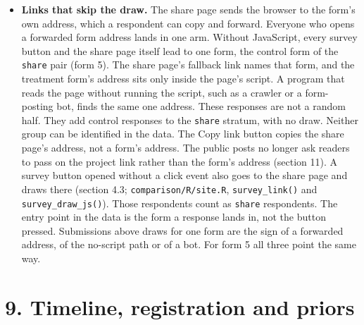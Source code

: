 \begin{itemize}
  \textbf{Respondents who give an email.} Their answers are also reported separately, as the survey
  promises. The registered analysis uses all responses.
\item
  \textbf{Links that skip the draw.} The share page sends the
  browser to the form's own address, which a respondent can copy and forward. Everyone who opens a
  forwarded form address lands in one arm. Without JavaScript, every survey button and the share
  page itself lead to one form, the control form of the \texttt{share} pair (form 5). The share page's
  fallback link names that form, and the treatment form's address sits only inside the page's
  script. A program that reads the page without running the script, such as a crawler or a
  form-posting bot, finds the same one address. These responses are not a random half. They add
  control responses to the \texttt{share} stratum, with no draw. Neither group can be identified in the
  data. The Copy link button copies the share page's address, not a form's address. The public
  posts no longer ask readers to pass on the project link rather than the form's address (section
  11). A survey button opened without a click event also goes to the share page and draws there
  (section 4.3; \texttt{comparison/R/site.R}, \texttt{survey\_link()} and \texttt{survey\_draw\_js()}). Those respondents
  count as \texttt{share} respondents. The entry point in the data is the form a response lands in, not
  the button pressed. Submissions above draws for one form are the sign of a forwarded address, of the
  no-script path or of a bot. For form 5 all three point the same way.
\end{itemize}

\section{9. Timeline, registration and priors}\label{timeline-registration-and-priors}

